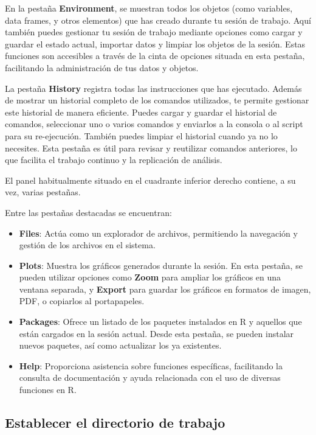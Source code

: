 \documentclass[
  letterpaper,
]{scrbook}
\begin{document}
En la pestaña \textbf{Environment}, se muestran todos los objetos (como
variables, data frames, y otros elementos) que has creado durante tu
sesión de trabajo. Aquí también puedes gestionar tu sesión de trabajo
mediante opciones como cargar y guardar el estado actual, importar datos
y limpiar los objetos de la sesión. Estas funciones son accesibles a
través de la cinta de opciones situada en esta pestaña, facilitando la
administración de tus datos y objetos.

La pestaña \textbf{History} registra todas las instrucciones que has
ejecutado. Además de mostrar un historial completo de los comandos
utilizados, te permite gestionar este historial de manera eficiente.
Puedes cargar y guardar el historial de comandos, seleccionar uno o
varios comandos y enviarlos a la consola o al script para su
re-ejecución. También puedes limpiar el historial cuando ya no lo
necesites. Esta pestaña es útil para revisar y reutilizar comandos
anteriores, lo que facilita el trabajo continuo y la replicación de
análisis.

El panel habitualmente situado en el cuadrante inferior derecho
contiene, a su vez, varias pestañas.

Entre las pestañas destacadas se encuentran:

\begin{itemize}
\item
  \textbf{Files}: Actúa como un explorador de archivos, permitiendo la
  navegación y gestión de los archivos en el sistema.
\item
  \textbf{Plots}: Muestra los gráficos generados durante la sesión. En
  esta pestaña, se pueden utilizar opciones como \textbf{Zoom} para
  ampliar los gráficos en una ventana separada, y \textbf{Export} para
  guardar los gráficos en formatos de imagen, PDF, o copiarlos al
  portapapeles.
\item
  \textbf{Packages}: Ofrece un listado de los paquetes instalados en R y
  aquellos que están cargados en la sesión actual. Desde esta pestaña,
  se pueden instalar nuevos paquetes, así como actualizar los ya
  existentes.
\item
  \textbf{Help}: Proporciona asistencia sobre funciones específicas,
  facilitando la consulta de documentación y ayuda relacionada con el
  uso de diversas funciones en R.
\end{itemize}

\hypertarget{establecer-el-directorio-de-trabajo}{%
\subsection{Establecer el directorio de
trabajo}\label{establecer-el-directorio-de-trabajo}}
\end{document}
